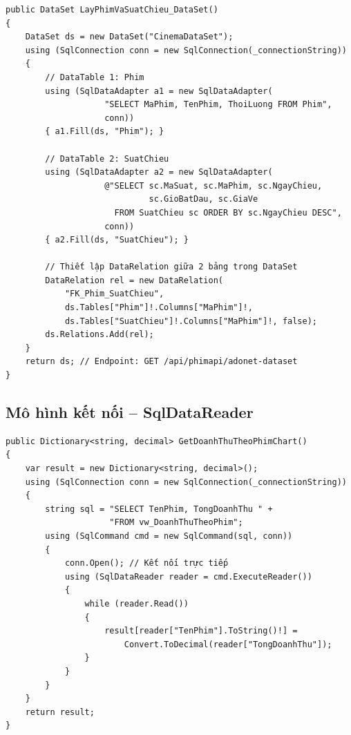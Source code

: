 \documentclass[12pt,a4paper,oneside]{book}
\theoremstyle{plain}
\numberwithin{equation}{chapter}
\begin{document}
\begin{lstlisting}[style=csharpstyle, caption={ADO.NET -- DataSet chứa Phim + SuatChieu + DataRelation}]
public DataSet LayPhimVaSuatChieu_DataSet()
{
    DataSet ds = new DataSet("CinemaDataSet");
    using (SqlConnection conn = new SqlConnection(_connectionString))
    {
        // DataTable 1: Phim
        using (SqlDataAdapter a1 = new SqlDataAdapter(
                    "SELECT MaPhim, TenPhim, ThoiLuong FROM Phim",
                    conn))
        { a1.Fill(ds, "Phim"); }

        // DataTable 2: SuatChieu
        using (SqlDataAdapter a2 = new SqlDataAdapter(
                    @"SELECT sc.MaSuat, sc.MaPhim, sc.NgayChieu,
                             sc.GioBatDau, sc.GiaVe
                      FROM SuatChieu sc ORDER BY sc.NgayChieu DESC",
                    conn))
        { a2.Fill(ds, "SuatChieu"); }

        // Thiết lập DataRelation giữa 2 bảng trong DataSet
        DataRelation rel = new DataRelation(
            "FK_Phim_SuatChieu",
            ds.Tables["Phim"]!.Columns["MaPhim"]!,
            ds.Tables["SuatChieu"]!.Columns["MaPhim"]!, false);
        ds.Relations.Add(rel);
    }
    return ds; // Endpoint: GET /api/phimapi/adonet-dataset
}
\end{lstlisting}

\subsection{Mô hình kết nối -- SqlDataReader}\label{sub4.3.3}

\begin{lstlisting}[style=csharpstyle, caption={ADO.NET -- SqlDataReader (mô hình kết nối, đọc View)}]
public Dictionary<string, decimal> GetDoanhThuTheoPhimChart()
{
    var result = new Dictionary<string, decimal>();
    using (SqlConnection conn = new SqlConnection(_connectionString))
    {
        string sql = "SELECT TenPhim, TongDoanhThu " +
                     "FROM vw_DoanhThuTheoPhim";
        using (SqlCommand cmd = new SqlCommand(sql, conn))
        {
            conn.Open(); // Kết nối trực tiếp
            using (SqlDataReader reader = cmd.ExecuteReader())
            {
                while (reader.Read())
                {
                    result[reader["TenPhim"].ToString()!] = 
                        Convert.ToDecimal(reader["TongDoanhThu"]);
                }
            }
        }
    }
    return result;
}
\end{lstlisting}
\end{document}
